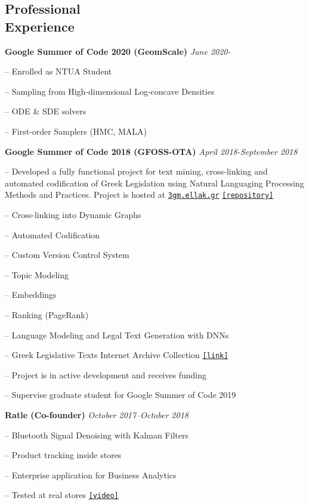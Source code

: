 \documentclass[margin, 10pt]{res}
\newcommand{\field}[2]{\noindent \textbf{#1} \hfill #2 \\}
\begin{document}
\begin{resume}
 
\section{Professional \\ Experience}
\field{Google Summer of Code 2020 (GeomScale)}  {\emph{June 2020-}}
\begin{compactitem}
\item[--] Enrolled as NTUA Student
\item[--] Sampling from High-dimensional Log-concave Densities
\item[--] ODE \& SDE solvers
\item[--] First-order Samplers (HMC, MALA) 
\end{compactitem}

\field{Google Summer of Code 2018 (GFOSS-OTA)}  {\emph{April 2018-September 2018}}
\begin{compactitem}
\item[--] Developed a fully functional project for text mining, cross-linking and automated codification of Greek Legislation using Natural Languaging Processing Methods and Practices. Project is hosted at \href{https://3gm.ellak.gr}{\nolinkurl{3gm.ellak.gr}} \href{https://github.com/eellak/gsoc2018-3gm}{\nolinkurl{[repository]}}
\begin{compactitem}
\item[--] Cross-linking into Dynamic Graphs
\item[--] Automated Codification
\item[--] Custom Version Control System
\item[--] Topic Modeling 
\item[--] Embeddings
\item[--] Ranking (PageRank)
\item[--] Language Modeling and Legal Text Generation with DNNs
\item[--] Greek Legislative Texts Internet Archive Collection \href{https://archive.org/details/greekgovernmentgazette}{\nolinkurl{[link]}}
\end{compactitem} 
\item[--] Project is in active development and receives funding
\item[--] Supervise graduate student for Google Summer of Code 2019 
\end{compactitem}

\field{Ratle (Co-founder)} {\emph{October 2017--October 2018}}
\begin{compactitem}
\item[--] Bluetooth Signal Denoising with Kalman Filters
\item[--] Product tracking inside stores
\item[--] Enterprise application for Business Analytics
\item[--] Tested at real stores \href{https://www.youtube.com/watch?v=XemEQaNxL3Q&feature=youtu.be}{\nolinkurl{[video]}}
\end{compactitem}



\end{resume}
\end{document}
